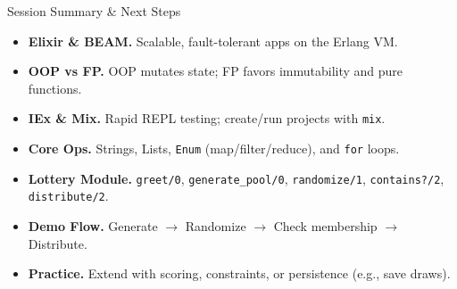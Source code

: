 \documentclass[aspectratio=169, table]{beamer}
\begin{document}
\begin{frame}{Session Summary \& Next Steps}
\vspace{20pt}
\begin{itemize}
  \item \textbf{Elixir \& BEAM.} Scalable, fault-tolerant apps on the Erlang VM. 
  \item \textbf{OOP vs FP.} OOP mutates state; FP favors immutability and pure functions.
  \item \textbf{IEx \& Mix.} Rapid REPL testing; create/run projects with \texttt{mix}.
  \item \textbf{Core Ops.} Strings, Lists, \texttt{Enum} (map/filter/reduce), and \texttt{for} loops.
  \item \textbf{Lottery Module.} \texttt{greet/0}, \texttt{generate\_pool/0}, \texttt{randomize/1}, \texttt{contains?/2}, \texttt{distribute/2}.
  \item \textbf{Demo Flow.} Generate $\rightarrow$ Randomize $\rightarrow$ Check membership $\rightarrow$ Distribute.
  \item \textbf{Practice.} Extend with scoring, constraints, or persistence (e.g., save draws).
\end{itemize}
\end{frame}
\end{document}
